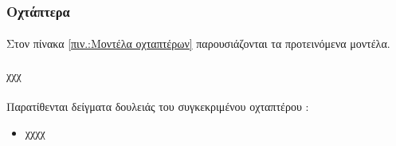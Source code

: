 \documentclass[a4paper, 12pt, twoside]{report}
\begin{document}
{{{{{{		\subsubsection{Οχτάπτερα}

			\paragraph{}{Στον πίνακα \ref{πιν.:Μοντέλα οχταπτέρων} παρουσιάζονται τα προτεινόμενα μοντέλα.
			}
			\paragraph{}{χχχ
			}
			\paragraph{}{Παρατίθενται δείγματα δουλειάς του συγκεκριμένου οχταπτέρου :
				\begin{itemize}
					\item \href{χχχχ}{χχχχ}
				\end{itemize}
			}

			\begin{landscape}	
			\setlength\LTleft{0pt}            %
			\setlength\LTright{0pt}           %
	

\end{landscape}}}}}}}
\end{document}
